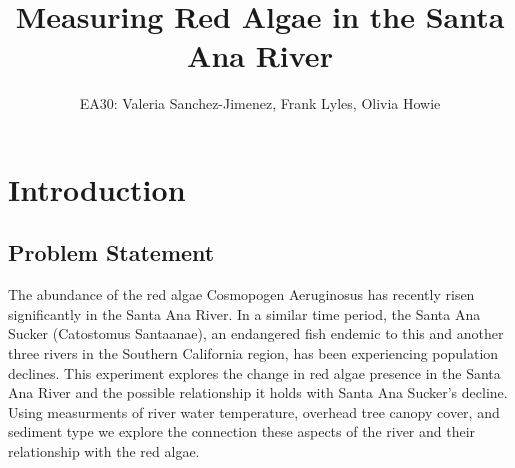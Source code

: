 \documentclass{article}
\title{Measuring Red Algae in the Santa Ana River}
\author{EA30: Valeria Sanchez-Jimenez, Frank Lyles, Olivia Howie}
\begin{document}



\maketitle

\newpage
\tableofcontents
\newpage

\section{Introduction}


\subsection{Problem Statement}

The abundance of the red algae Cosmopogen Aeruginosus has recently risen significantly in the Santa Ana River. In a similar time period, the Santa Ana Sucker (Catostomus Santaanae), an endangered fish endemic to this and another three rivers in the Southern California region, has been experiencing population declines. This experiment explores the change in red algae presence in the Santa Ana River and the possible relationship it holds with Santa Ana Sucker's decline. Using measurments of river water temperature, overhead tree canopy cover, and sediment type we explore the connection these aspects of the river and their relationship with the red algae.
\end{document}
